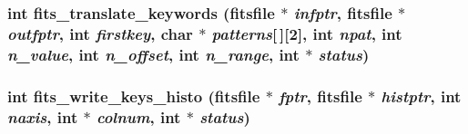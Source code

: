 \subsubsection{\setlength{\rightskip}{0pt plus 5cm}int fits\_\-translate\_\-keywords (\bf{fitsfile} $\ast$ {\em infptr}, \bf{fitsfile} $\ast$ {\em outfptr}, int {\em firstkey}, char $\ast$ {\em patterns}[$\,$][2], int {\em npat}, int {\em n\_\-value}, int {\em n\_\-offset}, int {\em n\_\-range}, int $\ast$ {\em status})}\label{src_2fitsio_8h_2895ae781125419a386901494196d211}


\subsubsection{\setlength{\rightskip}{0pt plus 5cm}int fits\_\-write\_\-keys\_\-histo (\bf{fitsfile} $\ast$ {\em fptr}, \bf{fitsfile} $\ast$ {\em histptr}, int {\em naxis}, int $\ast$ {\em colnum}, int $\ast$ {\em status})}\label{src_2fitsio_8h_70c980ef136c4ca7cb97f1e107f03458}


